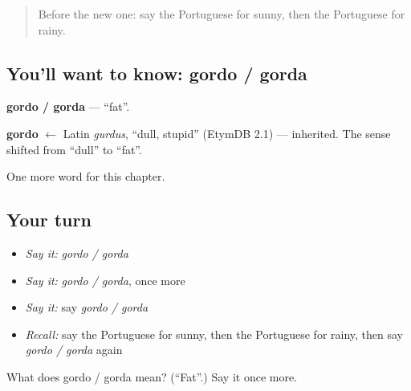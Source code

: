 \label{lesson:PT-C217-gordo-gorda}



\begin{quote}
Before the new one: say the Portuguese for sunny, then the Portuguese for rainy.
\end{quote}

\subsection*{You'll want to know: gordo / gorda}
\textbf{gordo / gorda} — \textquotedblleft{}fat\textquotedblright{}.

\begin{cousinweb}
\textbf{gordo} $\leftarrow$ Latin \emph{gurdus}, \textquotedblleft{}dull, stupid\textquotedblright{} (EtymDB 2.1) — inherited. The sense shifted from \textquotedblleft{}dull\textquotedblright{} to \textquotedblleft{}fat\textquotedblright{}.
\end{cousinweb}

\begin{grammarlens}[title={What you've built}]
One more word for this chapter.
\end{grammarlens}

\subsection*{Your turn}
\begin{itemize}
\raggedright
  \item \emph{Say it:} \emph{gordo / gorda}
  \item \emph{Say it:} \emph{gordo / gorda}, once more
  \item \emph{Say it:} say \emph{gordo / gorda}
  \item \emph{Recall:} say the Portuguese for sunny, then the Portuguese for rainy, then say \emph{gordo / gorda} again
\end{itemize}

\begin{tcolorbox}[breakable,colback=teal!4,colframe=teal!35!black,title={Before you move on}]
What does gordo / gorda mean? (\textquotedblleft{}Fat\textquotedblright{}.) Say it once more.
\end{tcolorbox}
